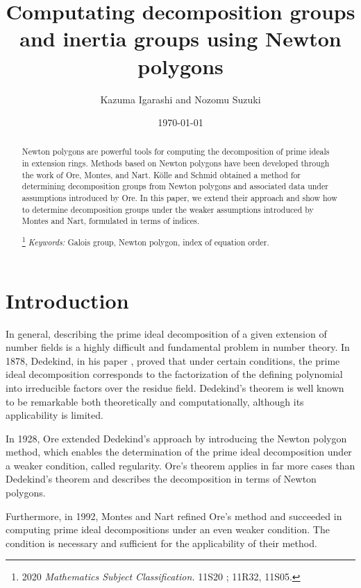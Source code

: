 \documentclass{article}
\theoremstyle{definition}
\theoremstyle{remark}
\numberwithin{equation}{section}
\begin{document}
\title{Computating decomposition groups and inertia groups using Newton polygons}
\author{Kazuma Igarashi and Nozomu Suzuki}
\date{\today}
\maketitle
\begin{abstract}
   Newton polygons are powerful tools for computing the decomposition of prime ideals in extension rings.
  Methods based on Newton polygons have been developed through the work of Ore, Montes, and Nart.
  K\"{o}lle and Schmid obtained a method for determining decomposition groups from Newton polygons and associated data under assumptions introduced by Ore.
  In this paper, we extend their approach and show how to determine decomposition groups under the weaker assumptions introduced by Montes and Nart, formulated in terms of indices.

  \renewcommand{\thefootnote}{\fnsymbol{footnote}}
  \footnote[0]{2020 \textit{Mathematics Subject Classification.} 11S20 ; 11R32, 11S05.}
  \renewcommand{\thefootnote}{\arabic{footnote}}
  \emph{Keywords:} Galois group, Newton polygon, index of equation order.
\end{abstract}

\section{Introduction}\label{sec:Intro}

  In general, describing the prime ideal decomposition of a given extension of number fields is a highly difficult and fundamental problem in number theory.
  In 1878, Dedekind, in his paper \cite{Dedekind1878}, proved that under certain conditions, the prime ideal decomposition corresponds to the factorization of the defining polynomial into irreducible factors over the residue field.
  Dedekind's theorem is well known to be remarkable both theoretically and computationally, although its applicability is limited.

  In 1928, Ore extended Dedekind's approach by introducing the Newton polygon method, which enables the determination of the prime ideal decomposition under a weaker condition, called regularity.
  Ore's theorem applies in far more cases than Dedekind's theorem and describes the decomposition in terms of Newton polygons. 

  Furthermore, in 1992, Montes and Nart refined Ore's method and succeeded in computing prime ideal decompositions under an even weaker condition.
  The condition is necessary and sufficient for the applicability of their method. 
\end{document}
